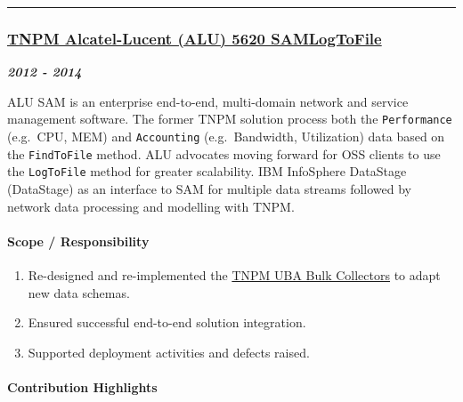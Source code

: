 \documentclass[
]{article}
\providecommand{\tightlist}{%
  \setlength{\itemsep}{0pt}\setlength{\parskip}{0pt}}
\begin{document}
\begin{center}\rule{0.5\linewidth}{0.5pt}\end{center}

\hypertarget{tnpm-alcatel-lucent-alu-5620-samlogtofile}{%
\subsubsection{\texorpdfstring{\href{http://www.ibm.com/support/knowledgecenter/SSBNJ7_1.3.2/com.ibm.tnpm_tp13J.doc/pack_rel_notes/ctnpm_relnotes_alcatel-lucent5620sam_logtofile2.1.0.0_tech_pak.html}{TNPM
Alcatel-Lucent (ALU) 5620
SAMLogToFile}}{TNPM Alcatel-Lucent (ALU) 5620 SAMLogToFile}}\label{tnpm-alcatel-lucent-alu-5620-samlogtofile}}

\textbf{\emph{2012 - 2014}}

ALU SAM is an enterprise end-to-end, multi-domain network and service
management software. The former TNPM solution process both the
\texttt{Performance} (e.g.~CPU, MEM) and \texttt{Accounting}
(e.g.~Bandwidth, Utilization) data based on the \texttt{FindToFile}
method. ALU advocates moving forward for OSS clients to use the
\texttt{LogToFile} method for greater scalability. IBM InfoSphere
DataStage (DataStage) as an interface to SAM for multiple data streams
followed by network data processing and modelling with TNPM.

\hypertarget{scope-responsibility-11}{%
\paragraph{Scope / Responsibility}\label{scope-responsibility-11}}

\begin{enumerate}
\def\labelenumi{\arabic{enumi}.}
\tightlist
\item
  Re-designed and re-implemented the
  \href{http://www.ibm.com/support/knowledgecenter/SSBNJ7_1.4.1/bulk_collector/c_tnpm_bcol_intro_tnpmcollectortypes.html}{TNPM
  UBA Bulk Collectors} to adapt new data schemas.
\item
  Ensured successful end-to-end solution integration.
\item
  Supported deployment activities and defects raised.
\end{enumerate}

\hypertarget{contribution-highlights-11}{%
\paragraph{Contribution Highlights}\label{contribution-highlights-11}}
\end{document}
